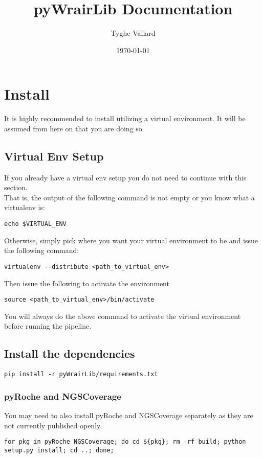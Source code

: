 \documentclass{article}
\begin{document}
\title{pyWrairLib Documentation}
\author{Tyghe Vallard}
\date{\today}
\maketitle
\tableofcontents

\pagebreak

\section{Install}
It is highly recommended to install utilizing a virtual environment. It will be assumed from here on that you are doing so.

\subsection{Virtual Env Setup}
If you already have a virtual env setup you do not need to continue with this section.\\
That is, the output of the following command is not empty or you know what a virtualenv is:
\begin{lstlisting}
echo $VIRTUAL_ENV
\end{lstlisting}
Otherwise, simply pick where you want your virtual environment to be and issue the following command:
\begin{lstlisting}
virtualenv --distribute <path_to_virtual_env>
\end{lstlisting}
Then issue the following to activate the environment
\begin{lstlisting}
source <path_to_virtual_env>/bin/activate
\end{lstlisting}
You will always do the above command to activate the virtual environment before running the pipeline.

\subsection{Install the dependencies}
\begin{lstlisting}
pip install -r pyWrairLib/requirements.txt
\end{lstlisting}

\subsubsection{pyRoche and NGSCoverage}
You may need to also install pyRoche and NGSCoverage separately as they are not currently published openly.
\begin{lstlisting}
for pkg in pyRoche NGSCoverage; do cd ${pkg}; rm -rf build; python setup.py install; cd ..; done;
\end{lstlisting}
\end{document}
